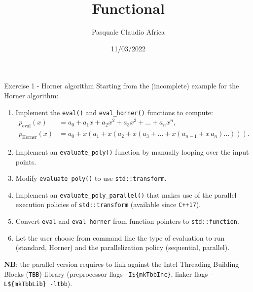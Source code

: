 \documentclass[10pt]{beamer}
\begin{document}
    \title{Functional}
    \author{Pasquale Claudio Africa}
    \date{11/03/2022}
    
\begin{frame}
    \maketitle
\end{frame}

\begin{frame}{Exercise 1 - Horner algorithm}
Starting from the (incomplete) example for the Horner algorithm:
\begin{enumerate}
\item Implement the \texttt{eval()} and \texttt{eval\_horner()} functions to compute:
\begin{align*}
p_\text{eval}(x) &= a_0 + a_1x + a_2x^2 + a_3x^3 + \ldots + a_nx^n, \\
p_\text{Horner}(x) &= a_0 + x \left(a_1 + x \left(a_2 + x \left(a_3 + \ldots + x\left(a_{n-1} + x \, a_n\right) \ldots \right) \right) \right).
\end{align*}
\item Implement an \texttt{evaluate\_poly()} function by manually looping over the input points.
\item Modify \texttt{evaluate\_poly()} to use \texttt{std::transform}.
\item Implement an \texttt{evaluate\_poly\_parallel()} that makes use of the parallel execution policies of \texttt{std::transform} (available since \texttt{C++17}).
\item Convert \texttt{eval} and \texttt{eval\_horner} from function pointers to \texttt{std::function}.
\item Let the user choose from command line the type of evaluation to run (standard, Horner) and the parallelization policy (sequential, parallel).
\end{enumerate}

\textbf{NB}: the parallel version requires to link against the Intel Threading Building Blocks (\texttt{TBB}) library (preprocessor flags \texttt{-I\$\{mkTbbInc\}}, linker flags \texttt{-L\$\{mkTbbLib\} -ltbb}).
\end{frame}
\end{document}
